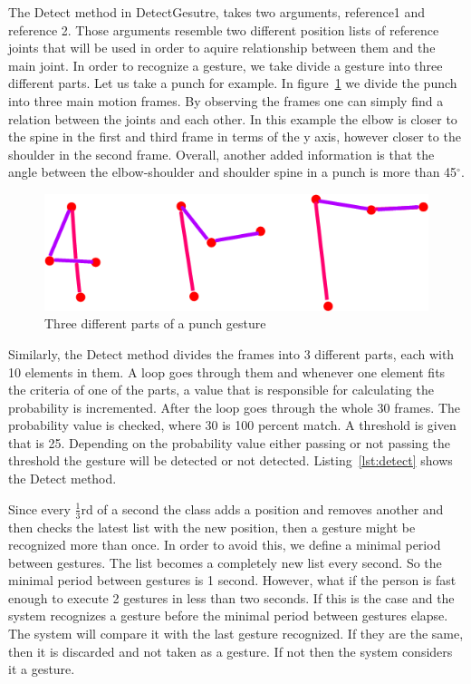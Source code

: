 The Detect method in DetectGesutre, takes two arguments, reference1 and reference 2. Those arguments resemble two different position lists of reference joints that will be used in order to aquire relationship between them and the main joint. In order to recognize a gesture, we take divide a gesture into three different parts. Let us take a punch for example. In figure~\ref{punch}
we divide the punch into three main motion frames. By observing the frames one can simply find a relation between the joints and each other. In this example the elbow is closer to the spine in the first and third frame in terms of the y axis, however closer to the shoulder in the second frame. Overall, another added information is that the angle between the elbow-shoulder and shoulder spine in a punch is more than 45$^\circ$. 

\begin{figure}[!htbp]
\centering
\includegraphics[width=1\textwidth]{images/punch.png}
\caption{Three different parts of a punch gesture}
\label{punch}
\end{figure}

Similarly, the Detect method divides the frames into 3 different parts, each with 10 elements in them. A loop goes through them and whenever one element fits the criteria of one of the parts, a value that is responsible for calculating the probability is incremented. After the loop goes through the whole 30 frames. The probability value is checked, where 30 is 100 percent match. A threshold is given that is 25. Depending on the probability value either passing or not passing the threshold the gesture will be detected or not detected. Listing~\ref{lst:detect} shows the Detect method.



Since every $\frac{1}{3}$rd of a second the class adds a position and removes another and then checks the latest list with the new position, then a gesture might be recognized more than once. In order to avoid this, we define a minimal period between gestures. The list becomes a completely new list every second. So the minimal period between gestures is 1 second. However, what if the person is fast enough to execute 2 gestures in less than two seconds. If this is the case and the system recognizes a gesture before the minimal period between gestures elapse. The system will compare it with the last gesture recognized. If they are the same, then it is discarded and not taken as a gesture. If not then the system considers it a gesture.


